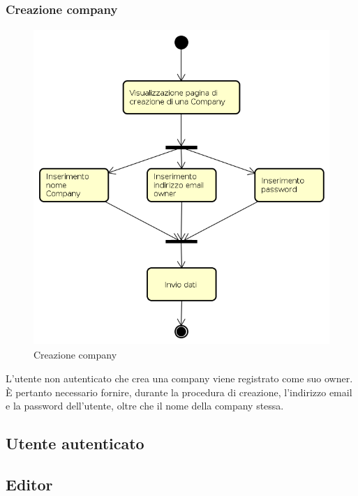 \subsubsection{Creazione company}
\begin{figure}[H]
\begin{center}
\includegraphics[height=12cm]{res/sections/backend/activities/creazioneCompany.png}
\caption{Creazione company}
\end{center}
\end{figure}
L'utente non autenticato che crea una company viene registrato come suo owner. È pertanto necessario fornire, durante la procedura di creazione, l'indirizzo email e la password dell'utente, oltre che il nome della company stessa.
\subsection{Utente autenticato}
\subsection{Editor}
